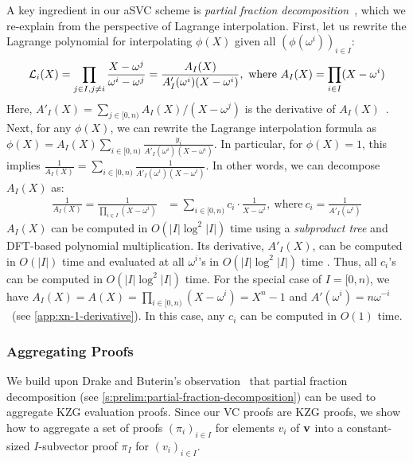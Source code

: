 A key ingredient in our aSVC scheme is \textit{partial fraction decomposition}\ifNotCameraReady~\cite{PartialFractionDecomposition}\fi, which we re-explain from the perspective of Lagrange interpolation.
First, let us rewrite the Lagrange polynomial for interpolating $\phi(X)$ given all $\left(\phi(\omega^i)\right)_{i\in I}$:
{\ifCameraReady\small\fi
\begin{align}
\lagr_i(X)=\prod_{j\in I, j\ne i} \frac{X-\omega^j}{\omega^i - \omega^j}=\frac{A_I(X)}{A'_I(\omega^i) (X-\omega^i)},\ \text{where}\ A_I(X)=\prod_{i\in I} (X-\omega^i)
\end{align}
}%
Here, $A'_I(X)=\sum_{j\in[0,n)} A_I(X)/(X-\omega^j)$ is the derivative of $A_I(X)$~\cite{vG13ModernCh10}.
Next, for any $\phi(X)$, we can rewrite the Lagrange interpolation formula as $\phi(X) = A_I(X)\sum_{i\in[0,n)} \frac{y_i}{A'_I(\omega^i)(X-\omega^i)}$.
In particular, for $\phi(X)=1$, this implies $\frac{1}{A_I(X)} = \sum_{i\in[0,n)} \frac{1}{A'_I(\omega^i)(X-\omega^i)}$.
In other words, we can decompose $A_I(X)$ as:
{\ifCameraReady\small\fi
\begin{align}
\frac{1}{A_I(X)} = \frac{1}{\prod_{i \in I} (X-\omega^i)} &= \sum_{i\in[0,n)} c_i\cdot \frac{1}{X-\omega^i},\ \text{where}\ c_i=\frac{1}{A'_I(\omega^i)}
\end{align}
}%
$A_I(X)$ can be computed in $O(|I|\log^2{|I|})$ time\ifNotCameraReady\xspace using a \textit{subproduct tree} and DFT-based polynomial multiplication\fi\xspace\cite{vG13ModernCh10}.
Its derivative, $A'_I(X)$, can be computed in $O(|I|)$ time and evaluated at all $\omega^i$'s in $O(|I|\log^2{|I|})$ time \cite{vG13ModernCh10}.
Thus, all $c_i$'s can be computed in $O(|I|\log^2{|I|})$ time.
For the special case of $I=[0,n)$, we have $A_I(X)=A(X)=\prod_{i\in[0,n)} (X-\omega^i)=X^n - 1$ and $A'(\omega^i)=n\omega^{-i}$ \ifCameraReady~\cite[Appendix A]{TAB+20e}\else\xspace(see \cref{app:xn-1-derivative})\fi.
In this case, any $c_i$ can be computed in $O(1)$ time.

\subsubsection{Aggregating Proofs}
\label{s:asvc:from-kzg:aggregating-proofs}
We build upon Drake and Buterin's observation~\cite{Buterin20UsingPoly} that partial fraction decomposition (see \cref{s:prelim:partial-fraction-decomposition}) can be used to aggregate KZG evaluation proofs.
Since our VC proofs are KZG proofs, we show how to aggregate a set of proofs $(\pi_i)_{i\in I}$ for elements $v_i$ of $\bm{\mathrm{v}}$ into a constant-sized $I$-subvector proof $\pi_I$ for $(v_i)_{i\in I}$.

